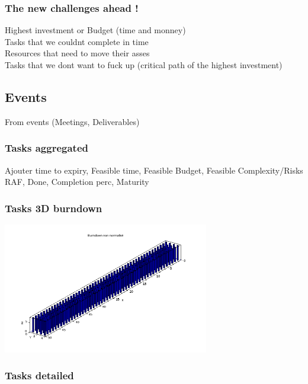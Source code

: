 \documentclass[8pt]{article} %
\begin{document}
\subsubsection{The new challenges ahead !}
Highest investment or Budget (time and monney)\\
Tasks that we couldnt complete in time\\
Resources that need to move their asses\\
Tasks that we dont want to fuck up (critical path of the highest investment)\\

\subsection{Events}
From events (Meetings, Deliverables)


\subsubsection{Tasks aggregated}
Ajouter time to expiry, Feasible time, Feasible Budget, Feasible Complexity/Risks
RAF, Done, Completion perc, Maturity\\



%
\subsubsection{Tasks 3D burndown}
%
\includegraphics[width=90mm]{Scilab-burndown.png}

\subsubsection{Tasks detailed}


\end{document}
